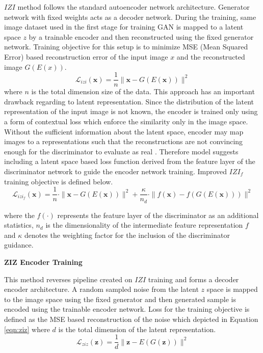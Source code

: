 {$IZI$ method follows the standard autoencoder network architecture. Generator network with fixed
weights acts as a decoder network. During the training, same image dataset used in the first stage
for training GAN is mapped to a latent space $z$ by a trainable encoder and then reconstructed
using the fixed generator network. Training objective for this setup is to minimize MSE (Mean
Squared Error) based reconstruction error of the input image $x$ and the reconstructed image
$G(E(x))$. 
\begin{equation}
	\mathcal{L}_{i z i}(\mathbf{x})=\frac{1}{n}\|\mathbf{x}-G(E(\mathbf{x}))\|^{2}
\end{equation}
where $n$ is the total dimension size of the data.
This approach has an important drawback regarding to latent representation. Since the distribution
of the latent representation of the input image is not known, the encoder is trained only using a
form of contextual loss which enforce the similarity only in the image space. Without the
sufficient information about the latent space, encoder may map images to a representations such
that the reconstructions are not convincing enough for the discriminator to evaluate as real
\cite{pub.1111824956}. Therefore model suggests including a latent space based loss
function derived from the feature layer of the discriminator network to guide the encoder network 
training. Improved $IZI_{f}$ training objective is defined below.
\begin{equation}
	\mathcal{L}_{i z i_{f}}(\mathbf{x})=\frac{1}{n} \cdot\|\mathbf{x}-G(E(\mathbf{x}))\|^{2}+\frac{\kappa}{n_{d}} \cdot\|f(\mathbf{x})-f(G(E(\mathbf{x})))\|^{2}
\end{equation}

where the $f(\cdot)$ represents the feature layer of the discriminator as an additional statistics, $n_{d}$ is
the dimensionality of the intermediate feature representation $f$ and $\kappa$ denotes the weighting
factor for the inclusion of the discriminator guidance.

\textbf{ZIZ Encoder Training}

This method reverses pipeline created on $IZI$ training and forms a decoder
encoder architecture. A random sampled noise from the latent $z$ space is mapped to the image space using the
fixed generator and then generated sample is encoded using the trainable encoder network. Loss
for the training objective is defined as the MSE based reconstruction of the noise which depicted in Equation
\ref{eqn:ziz} where $d$ is the total dimension of the latent representation.
\begin{equation}
\label{eqn:ziz}
	\mathcal{L}_{z i z}(\mathbf{z})=\frac{1}{d}\|\mathbf{z}-E(G(\mathbf{z}))\|^{2}
\end{equation}

}
